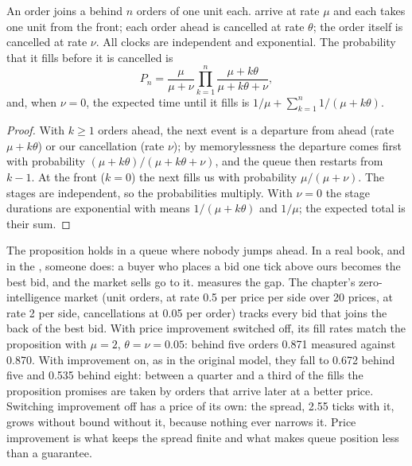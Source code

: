 \begin{proposition}\label{prop:mx:the-limit-order-book:fill}
An order joins a  behind $n$ orders of one unit each.  arrive at rate $\mu$ and each takes one unit from the front; each
order ahead is cancelled at rate $\theta$; the order itself is cancelled at rate $\nu$. All clocks are independent and exponential. The probability
that it fills before it is cancelled is
\[
P_n=\frac{\mu}{\mu+\nu}\prod_{k=1}^{n}\frac{\mu+k\theta}{\mu+k\theta+\nu},
\]
and, when $\nu=0$, the expected time until it fills is $1/\mu+\sum_{k=1}^{n}1/(\mu+k\theta)$.
\end{proposition}

\begin{proof}
With $k\ge1$ orders ahead, the next event is a departure from ahead (rate $\mu+k\theta$) or our cancellation (rate $\nu$); by memorylessness the
departure comes first with probability $(\mu+k\theta)/(\mu+k\theta+\nu)$, and the queue then restarts from $k-1$. At the front ($k=0$) the next
 fills us with probability $\mu/(\mu+\nu)$. The stages are independent, so the probabilities multiply. With $\nu=0$ the stage
durations are exponential with means $1/(\mu+k\theta)$ and $1/\mu$; the expected total is their sum.
\end{proof}

\label{lst:mx:the-limit-order-book:fill}

The proposition holds in a queue where nobody jumps ahead. In a real book, and in the , someone does: a buyer who places
a bid one tick above ours becomes the best bid, and the market sells go to it.  measures the gap. The chapter's
zero-intelligence market (unit orders,  at rate 0.5 per price per side over 20 prices,  at rate 2 per side, cancellations at
0.05 per order) tracks every bid that joins the back of the best bid. With price improvement switched off, its fill rates match the proposition with
$\mu=2$, $\theta=\nu=0.05$: behind five orders 0.871 measured against 0.870. With improvement on, as in the original model, they fall to 0.672 behind
five and 0.535 behind eight: between a quarter and a third of the fills the proposition promises are taken by orders that arrive
later at a better price. Switching
improvement off has a price of its own: the spread, 2.55 ticks with it, grows without bound without it, because nothing ever narrows it. Price
improvement is what keeps the spread finite and what makes queue position less than a guarantee.

